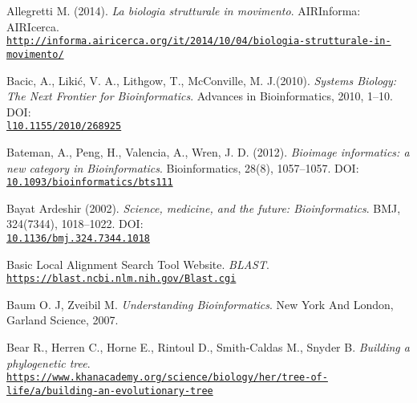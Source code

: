 \documentclass[twoside,openright,titlepage,fleqn,
,	headinclude,12pt,a4paper,BCOR5mm,footinclude,table]{scrbook}
\newcommand{\?}{'\-\nobreak\hspace{0pt}}
\begin{document}
\begin{thebibliography}{60}

Allegretti M. (2014).\newline
\textit{La biologia strutturale in movimento}. \newline
AIRInforma: AIRIcerca.
\\\texttt{\url{http://informa.airicerca.org/it/2014/10/04/biologia-strutturale-in-movimento/}}

Bacic, A., Likić, V. A., Lithgow, T., McConville, M. J.(2010).\newline 
\textit{Systems Biology: The Next Frontier for Bioinformatics}.\newline
Advances in Bioinformatics, 2010, 1–10. \newline
DOI: \\\texttt{\url{l10.1155/2010/268925}}

Bateman, A., Peng, H., Valencia, A., Wren, J. D. (2012).\newline
\textit{Bioimage informatics: a new category in Bioinformatics}. \newline
Bioinformatics, 28(8), 1057–1057. \newline
DOI: \\\texttt{\url{10.1093/bioinformatics/bts111}}

Bayat Ardeshir (2002).\newline
\textit{Science, medicine, and the future: Bioinformatics}.\newline
BMJ, 324(7344), 1018–1022.
DOI: \\\texttt{\url{10.1136/bmj.324.7344.1018}}

Basic Local Alignment Search Tool Website.\newline
\textit{BLAST}.
\\\texttt{\url{https://blast.ncbi.nlm.nih.gov/Blast.cgi}}

Baum O. J, Zveibil M. \newline
\textit{Understanding Bioinformatics}.\newline
New York And London, Garland Science, 2007.

Bear R., Herren C., Horne E., Rintoul D., Smith-Caldas M., Snyder B. \newline
\textit{Building a phylogenetic tree}.
\\\texttt{\url{https://www.khanacademy.org/science/biology/her/tree-of-life/a/building-an-evolutionary-tree}}


\end{thebibliography}
\end{document}

